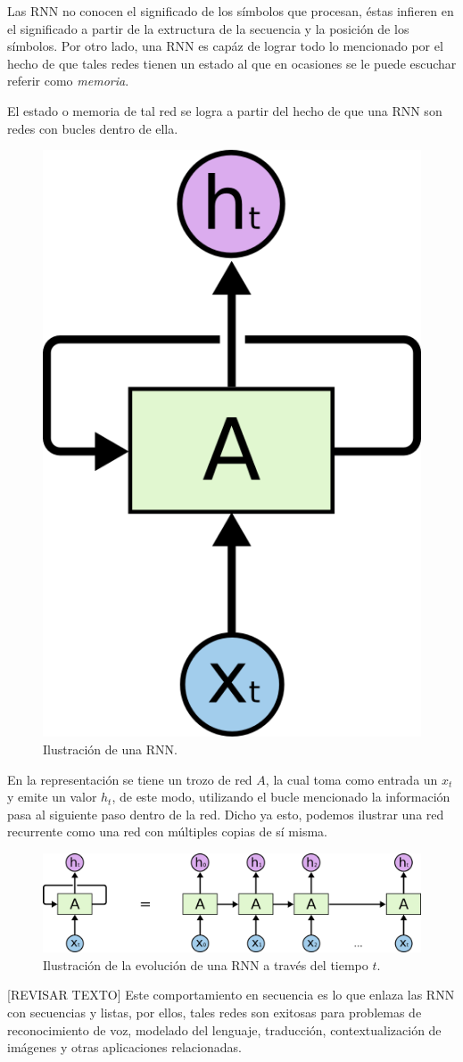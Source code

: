 \documentclass[12pt, letterpaper]{article}
\begin{document}
        Las RNN no conocen el significado de los símbolos que procesan, éstas infieren en el significado a partir de la extructura de la secuencia y la posición de los símbolos. Por otro lado, una RNN es capáz de lograr todo lo mencionado por el hecho de que tales redes tienen un estado al que en ocasiones se le puede escuchar referir como \emph{memoria}.
    
        El estado o memoria de tal red se logra a partir del hecho de que una RNN son redes con bucles dentro de ella.
    
        \begin{figure}[H]
            \centering
            \includegraphics[width=0.2\linewidth]{img/RNN-rolled.png}
            \caption{Ilustración de una RNN.}
        \end{figure}
    
        En la representación se tiene un trozo de red $A$, la cual toma como entrada un $x_t$ y emite un valor $h_t$, de este modo, utilizando el bucle mencionado la información pasa al siguiente paso dentro de la red. Dicho ya esto, podemos ilustrar una red recurrente como una red con múltiples copias de sí misma\cite{Understanding_LSTM}.
    
        \begin{figure}[H]
            \centering
            \includegraphics[width=\linewidth]{img/RNN-unrolled.png}
            \caption{Ilustración de la evolución de una RNN a través del tiempo $t$.}
        \end{figure}
        [REVISAR TEXTO]
        Este comportamiento en secuencia es lo que enlaza las RNN con secuencias y listas, por ellos, tales redes son exitosas para problemas de reconocimiento de voz, modelado del lenguaje, traducción, contextualización de imágenes y otras aplicaciones relacionadas\cite{rnn-effectiveness}.
\end{document}
